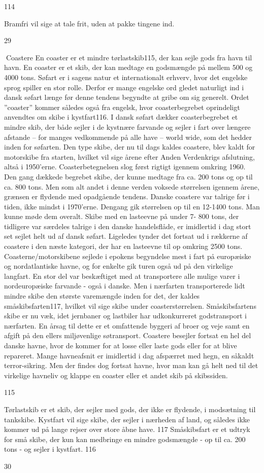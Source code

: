114

Bramfri vil sige at tale frit, uden at pakke tingene ind.

29

Coastere En coaster er et mindre tørlastskib115, der kan sejle gods fra
havn til havn. En coaster er et skib, der kan medtage en godsmængde på
mellem 500 og 4000 tons. Søfart er i sagens natur et internationalt
erhverv, hvor det engelske sprog spiller en stor rolle. Derfor er mange
engelske ord gledet naturligt ind i dansk søfart længe før denne tendens
begyndte at gribe om sig generelt. Ordet ''coaster'' kommer således også
fra engelsk, hvor coasterbegrebet oprindeligt anvendtes om skibe i
kystfart116. I dansk søfart dækker coasterbegrebet et mindre skib, der
både sejler i de kystnære farvande og sejler i fart over længere
afstande -- for manges vedkommende på alle have -- world wide, som det
hedder inden for søfarten. Den type skibe, der nu til dags kaldes
coastere, blev kaldt for motorskibe fra starten, hvilket vil sige årene
efter Anden Verdenkrigs afslutning, altså i 1950'erne.
Coasterbetegnelsen slog først rigtigt igennem omkring 1960. Den gang
dækkede begrebet skibe, der kunne medtage fra ca. 200 tons og op til ca.
800 tons. Men som alt andet i denne verden voksede størrelsen igennem
årene, grænsen er flydende med opadgående tendens. Danske coastere var
talrige før i tiden, ikke mindst i 1970'erne. Dengang gik størrelsen op
til en 12-1400 tons. Man kunne møde dem overalt. Skibe med en lasteevne
på under 7- 800 tons, der tidligere var særdeles talrige i den danske
handelsflåde, er imidlertid i dag stort set sejlet helt ud af dansk
søfart. Ligeledes tynder det fortsat ud i rækkerne af coastere i den
næste kategori, der har en lasteevne til op omkring 2500 tons.
Coasterne/motorskibene sejlede i epokens begyndelse mest i fart på
europæiske og nordatlantiske havne, og for enkelte gik turen også ud på
den virkelige langfart. En stor del var beskæftiget med at transportere
alle mulige varer i nordeuropæiske farvande - også i danske. Men i
nærfarten transporterede lidt mindre skibe den største varemængde inden
for det, der kaldes småskibsfarten117, hvilket vil sige skibe under
coasterstørrelsen. Småskibsfartens skibe er nu væk, idet jernbaner og
lastbiler har udkonkurreret godstransport i nærfarten. En årsag til
dette er et omfattende byggeri af broer og veje samt en afgift på den
ellers miljøvenlige søtransport. Coastere besejler fortsat en hel del
danske havne, hvor de kommer for at losse eller laste gods eller for at
blive repareret. Mange havneafsnit er imidlertid i dag afspærret med
hegn, en såkaldt terror-sikring. Men der findes dog fortsat havne, hvor
man kan gå helt ned til det virkelige havneliv og klappe en coaster
eller et andet skib på skibssiden.

115

Tørlastskib er et skib, der sejler med gods, der ikke er flydende, i
modsætning til tankskibe. Kystfart vil sige skibe, der sejler i nærheden
af land, og således ikke kommer ud på lange rejser over store åbne have.
117 Småskibsfart er et udtryk for små skibe, der kun kan medbringe en
mindre godsmængde - op til ca. 200 tons - og sejler i kystfart. 116

30

